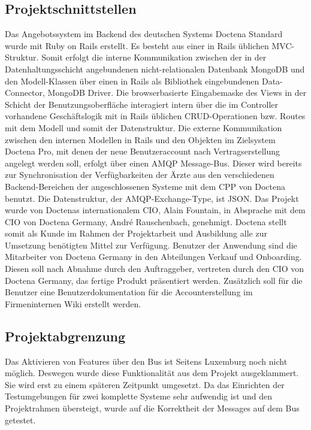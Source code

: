 \subsection{Projektschnittstellen} 
\label{sec:Projektschnittstellen}
Das Angebotssystem im Backend des deutschen Systems Doctena Standard wurde mit Ruby on Rails erstellt. Es besteht aus einer in Rails üblichen MVC-Struktur. Somit erfolgt die interne Kommunikation zwischen der in der Datenhaltungsschicht angebundenen nicht-relationalen Datenbank MongoDB und den Modell-Klassen über einen in Rails als Bibliothek eingebundenen Data-Connector, MongoDB Driver. Die browserbasierte Eingabemaske des Views in der Schicht der Benutzungsoberfläche interagiert intern über die im Controller vorhandene Geschäftslogik mit in Rails üblichen CRUD-Operationen bzw. Routes mit dem Modell und somit der Datenstruktur.
Die externe Kommunikation zwischen den internen Modellen in Rails und den Objekten im Zielsystem Doctena Pro, mit denen der neue Benutzeraccount nach Vertragserstellung angelegt werden soll, erfolgt über einen AMQP Message-Bus. Dieser wird bereits zur Synchronisation der Verfügbarkeiten der Ärzte aus den verschiedenen Backend-Bereichen der angeschlossenen Systeme mit dem CPP von Doctena benutzt. Die Datenstruktur, der AMQP-Exchange-Type, ist JSON.
Das Projekt wurde von Doctenas internationalem CIO, Alain Fountain, in Absprache mit dem CIO von Doctena Germany, André Rauschenbach, genehmigt. Doctena stellt somit als Kunde im Rahmen der Projektarbeit und Ausbildung alle zur Umsetzung benötigten Mittel zur Verfügung.
Benutzer der Anwendung sind die Mitarbeiter von Doctena Germany in den Abteilungen Verkauf und Onboarding.
Diesen soll nach Abnahme durch den Auftraggeber, vertreten durch den CIO von Doctena Germany, das fertige Produkt präsentiert werden. Zusätzlich soll für die Benutzer eine Benutzerdokumentation für die Accounterstellung im Firmeninternen Wiki erstellt werden.

\subsection{Projektabgrenzung} 
\label{sec:Projektabgrenzung}
Das Aktivieren von Features über den Bus ist Seitens Luxemburg noch nicht möglich. Deswegen wurde diese Funktionalität aus dem Projekt ausgeklammert. Sie wird erst zu einem späteren Zeitpunkt umgesetzt. Da das Einrichten der Testumgebungen für zwei komplette Systeme sehr aufwendig ist und den Projektrahmen übersteigt, wurde auf die Korrektheit der Messages auf dem Bus getestet.
